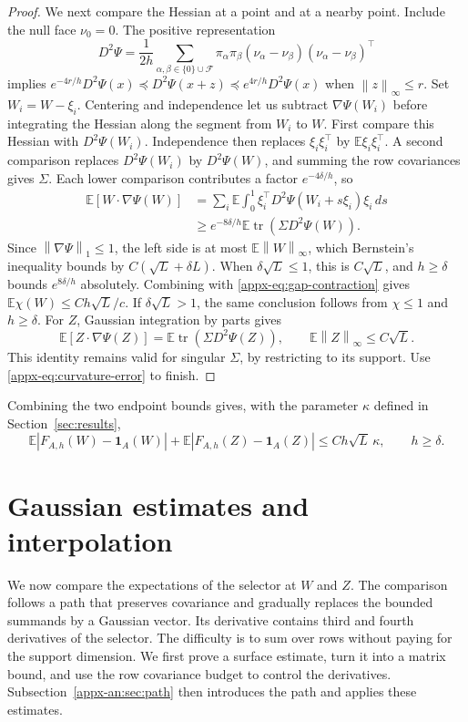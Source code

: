 \documentclass[11pt,letterpaper]{article}
\theoremstyle{remark}
\newcommand{\E}{\mathbb E}
\newcommand{\cF}{\mathcal F}
\newcommand{\tr}{\operatorname{tr}}
\newcommand{\norm}[1]{\left\lVert#1\right\rVert}
\newcommand{\ind}{\mathbf 1}
\newcommand{\dd}{\,d}
\begin{document}
\begin{proof}
We next compare the Hessian at a point and at a nearby point.  Include
the null face \(\nu_0=0\).  The positive representation
\[
 D^2\Psi=\frac1{2h}\sum_{\alpha,\beta\in\{0\}\cup\cF}
 \pi_\alpha\pi_\beta
 (\nu_\alpha-\nu_\beta)(\nu_\alpha-\nu_\beta)^\top
\]
implies
\(e^{-4r/h}D^2\Psi(x)\preceq D^2\Psi(x+z)
\preceq e^{4r/h}D^2\Psi(x)\) when \(\norm z_\infty\le r\).
Set \(W_i=W-\xi_i\). Centering and independence let us subtract
\(\nabla\Psi(W_i)\) before integrating the Hessian along the segment
from \(W_i\) to \(W\). First compare this Hessian with
\(D^2\Psi(W_i)\). Independence then replaces
\(\xi_i\xi_i^\top\) by \(\E\xi_i\xi_i^\top\). A second comparison
replaces \(D^2\Psi(W_i)\) by \(D^2\Psi(W)\), and summing the row
covariances gives \(\Sigma\). Each lower comparison contributes a factor
\(e^{-4\delta/h}\), so
\[
 \begin{split}
 \E[W\cdot\nabla\Psi(W)]
 &=\sum_i\E\int_0^1
 \xi_i^\top D^2\Psi(W_i+s\xi_i)\xi_i\dd s\\
 &\ge e^{-8\delta/h}\E\tr(\Sigma D^2\Psi(W)).
 \end{split}
\]
Since \(\norm{\nabla\Psi}_1\le1\), the left side is at most
\(\E\norm W_\infty\), which Bernstein's inequality bounds by
\(C(\sqrt L+\delta L)\). When \(\delta\sqrt L\le1\), this is
\(C\sqrt L\), and \(h\ge\delta\) bounds \(e^{8\delta/h}\)
absolutely. Combining with \eqref{appx-eq:gap-contraction} gives
\(\E\chi(W)\le Ch\sqrt L/c\).
If \(\delta\sqrt L>1\), the same conclusion follows from
\(\chi\le1\) and \(h\ge\delta\).
For \(Z\), Gaussian integration by parts gives
\[
 \E[Z\cdot\nabla\Psi(Z)]
 =\E\tr(\Sigma D^2\Psi(Z)),\qquad
 \E\norm Z_\infty\le C\sqrt L.
\]
This identity remains valid for singular \(\Sigma\), by restricting to
its support. Use \eqref{appx-eq:curvature-error} to finish.
\end{proof}


Combining the two endpoint bounds gives, with the
parameter \(\kappa\) defined in Section~\ref{sec:results},
\begin{equation}
 \E|F_{A,h}(W)-\ind_A(W)|+
 \E|F_{A,h}(Z)-\ind_A(Z)|
 \le Ch\sqrt L\,\kappa,\qquad h\ge\delta.
 \label{appx-eq:endpoint-min}
\end{equation}


\section{Gaussian estimates and interpolation}\label{appx-sec:support}

We now compare the expectations of the selector at \(W\) and \(Z\).
The comparison follows a path that preserves covariance and gradually
replaces the bounded summands by a Gaussian vector.  Its derivative
contains third and fourth derivatives of the selector.  The difficulty is to sum over rows without paying for the support
dimension. We first prove a surface estimate, turn it into a matrix
bound, and use the row covariance budget to control the derivatives.
Subsection~\ref{appx-an:sec:path} then introduces the path and applies these
estimates.
\end{document}
